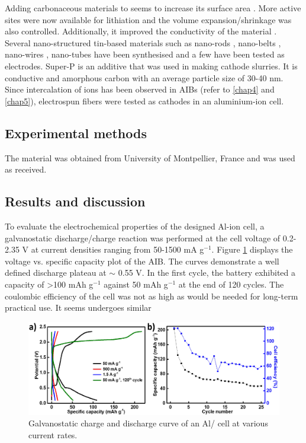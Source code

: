 Adding carbonaceous materials to  seems to increase its surface area \cite{navarro-suarez_2d_nodate}. More active sites were now available for lithiation and the volume expansion/shrinkage was also controlled. Additionally, it improved the conductivity of the material \cite{nowak_composites_2018}. Several nano-structured tin-based materials such as nano-rods \cite{liu_direct_2009}, nano-belts \cite{duan_single_2005}, nano-wires \cite{huang_situ_2010}, nano-tubes \cite{wang_large-scale_2011} have been synthesised and a few have been tested as electrodes. Super-P is an additive that was used in making cathode slurries. It is conductive and amorphous carbon with an average particle size of 30-40 nm. 
Since intercalation of ions has been observed in AIBs (refer to \ref{chap4} and \ref{chap5}), electrospun  fibers were tested as cathodes in an aluminium-ion cell. 

\subsection{Experimental methods}
The material was obtained from University of Montpellier, France and was used as received. 

\subsection{Results and discussion}
To evaluate the electrochemical properties of the designed Al-ion cell, a galvanostatic discharge/charge reaction was performed at the cell voltage of 0.2-2.35 V at current densities ranging from 50-1500 mA g$^{-1}$. Figure \ref{Figures/chap6fig:SnO2perfCDC} displays the voltage vs. specific capacity plot of the AIB. The curves demonstrate a well defined discharge plateau at $\sim$ 0.55 V. In the first cycle, the
battery exhibited a capacity of >100 mAh g$^{-1}$ against 50 mAh g$^{-1}$ at the end of 120 cycles. The coulombic efficiency of the cell was not as high as would be needed for long-term practical use. It seems  undergoes similar  

 \begin{figure}[th!]
  \centering
  \includegraphics[width=\textwidth]{Figures/chap6fig/SnO2perfCDC}
    \caption{Galvanostatic charge and discharge curve of an Al/ cell at various current rates.}
  \label{Figures/chap6fig:SnO2perfCDC}
\end{figure}

